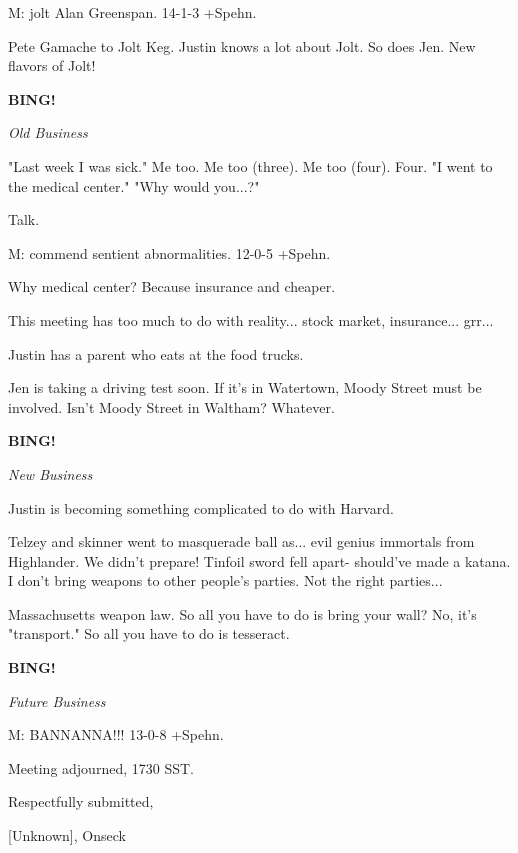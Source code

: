 \documentclass[12pt]{article}
\newcommand{\bing}{{\bf BING!} }
\newcommand{\goto}[1]{\bing \vskip 12pt \centerline{{\em{#1}}}}
\begin{document}
M: jolt Alan Greenspan. 14-1-3 +Spehn.

Pete Gamache to Jolt Keg. Justin knows a lot about Jolt. So does Jen. New flavors of Jolt!

\goto{Old Business}

"Last week I was sick." Me too. Me too (three). Me too (four). Four. "I went to the medical center." "Why would you...?"

Talk.

M: commend sentient abnormalities. 12-0-5 +Spehn.

Why medical center? Because insurance and cheaper.

This meeting has too much to do with reality... stock market, insurance... grr...

Justin has a parent who eats at the food trucks.

Jen is taking a driving test soon. If it's in Watertown, Moody Street must be involved. Isn't Moody Street in Waltham? Whatever.

\goto{New Business}

Justin is becoming something complicated to do with Harvard.

Telzey and skinner went to masquerade ball as... evil genius immortals from Highlander. We didn't prepare! Tinfoil sword fell apart- should've made a katana. I don't bring weapons to other people's parties. Not the right parties...

Massachusetts weapon law. So all you have to do is bring your wall? No, it's "transport." So all you have to do is tesseract.

\goto{Future Business}

M: BANNANNA!!! 13-0-8 +Spehn.

\vspace{12pt}

\noindent
Meeting adjourned, 1730 SST.

\vspace{18pt}

\centerline{Respectfully submitted,}
\centerline{[Unknown], Onseck}
\end{document}

